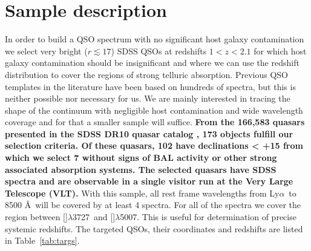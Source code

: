 \documentclass{aa}    %
\newcommand{\Tab}[1]{Table~\ref{tab:#1}}
\newcommand{\tab}[1]{\Tab{#1}}
\newcommand{\sectlabel}[1]{\label{sect:#1}}
\newcommand{\lya}{Ly$\alpha$}
\newcommand{\oii}{[\ion{O}{ii}]$\lambda$3727}
\newcommand{\oiii}{[\ion{O}{iii}]$\lambda$5007}
\begin{document}
\section{Sample description}   \sectlabel{sample}

In order to build a QSO spectrum with no significant host galaxy
contamination we select very bright ($r \lesssim 17$) SDSS QSOs at
redshifts $1 < z < 2.1$ for which host galaxy contamination should be
insignificant and where we can use the redshift distribution to cover
the regions of strong telluric absorption. Previous QSO templates in
the literature have been based on hundreds of spectra, but this is
neither possible nor necessary for us. We are mainly interested in
tracing the shape of the continuum with negligible host contamination
and wide wavelength coverage and for that a smaller sample will
suffice. \textbf{From the 166,583 quasars presented in the SDSS DR10 quasar catalog \citep{Paris2014}, 173 objects fulfill our selection criteria. Of these quasars, 102 have declinations < +15 from which we select 7 without signs of BAL activity or other strong associated absorption systems. The selected quasars have SDSS spectra and are observable in a single visitor run at the Very Large Telescope (VLT).} With this sample, all rest frame
wavelengths from \lya~to 8500 \AA~will be covered by at least 4
spectra. For all of the spectra we cover the region between \oii~and
\oiii. This is useful for determination of precise systemic
redshifts. The targeted QSOs, their coordinates and redshifts are
listed in \tab{targs}.
\end{document}
